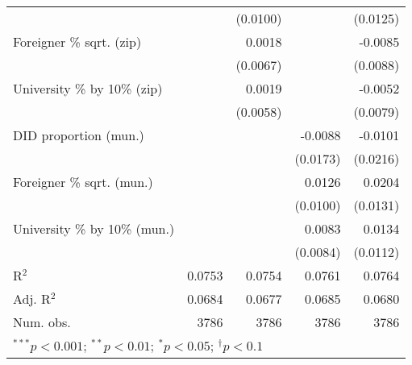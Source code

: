 \begin{tabular}{l D{.}{.}{4.7} D{.}{.}{4.7} D{.}{.}{4.7} D{.}{.}{4.7}}
                                  &               & (0.0100)      &               & (0.0125)      \\
Foreigner \% sqrt. (zip)          &               & 0.0018        &               & -0.0085       \\
                                  &               & (0.0067)      &               & (0.0088)      \\
University \% by 10\% (zip)       &               & 0.0019        &               & -0.0052       \\
                                  &               & (0.0058)      &               & (0.0079)      \\
DID proportion (mun.)             &               &               & -0.0088       & -0.0101       \\
                                  &               &               & (0.0173)      & (0.0216)      \\
Foreigner \% sqrt. (mun.)         &               &               & 0.0126        & 0.0204        \\
                                  &               &               & (0.0100)      & (0.0131)      \\
University \% by 10\% (mun.)      &               &               & 0.0083        & 0.0134        \\
                                  &               &               & (0.0084)      & (0.0112)      \\
\midrule
R$^2$                             & 0.0753        & 0.0754        & 0.0761        & 0.0764        \\
Adj. R$^2$                        & 0.0684        & 0.0677        & 0.0685        & 0.0680        \\
Num. obs.                         & 3786          & 3786          & 3786          & 3786          \\
\bottomrule
{}
\end{tabular}
